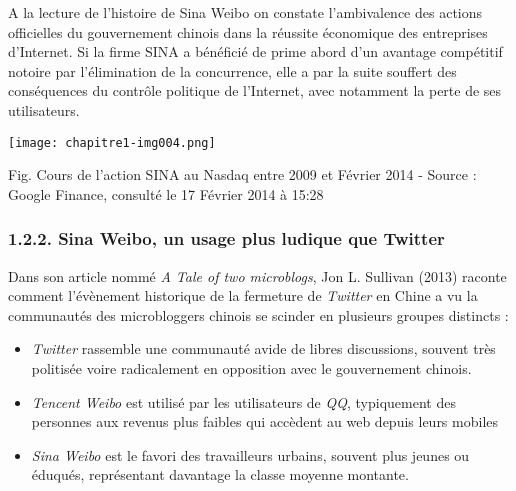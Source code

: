 \bigskip

{\color{black}
A la lecture de l'histoire de Sina Weibo on constate l'ambivalence des actions officielles du gouvernement chinois dans
la r\'eussite \'economique des entreprises d'Internet. Si la firme SINA a b\'en\'efici\'e de prime abord d'un avantage
comp\'etitif notoire par l'\'elimination de la concurrence, elle a par la suite souffert des cons\'equences du
contr\^ole politique de l'Internet, avec notamment la perte de ses utilisateurs.}


\bigskip



\begin{center}
\texttt{[image: chapitre1-img004.png]}
\end{center}
{\raggedleft\color{black}
Fig. Cours de l'action SINA au Nasdaq entre 2009 et F\'evrier 2014 - \newline
Source : Google Finance, consult\'e le 17 F\'evrier 2014 \`a 15:28 
\par}


\bigskip

\subsubsection[1.2.2. Sina Weibo, un usage plus ludique que Twitter ]{1.2.2. Sina Weibo, un usage plus ludique que
Twitter }
\hypertarget{RefHeading131699228146}{}{\color{black}
Dans son article nomm\'e \textit{A Tale of two microblogs}, Jon L. Sullivan (2013) raconte comment l'\'ev\`enement
historique de la fermeture de \textit{Twitter }en Chine a vu la communaut\'es des microbloggers chinois se scinder en
plusieurs groupes distincts : }

\liststyleWWviiiNumii
\begin{itemize}
\item {\color{black}
\textit{Twitter }rassemble une communaut\'e avide de libres discussions, souvent tr\`es politis\'ee voire radicalement
en opposition avec le gouvernement chinois.}
\item {\color{black}
\textit{Tencent Weibo} est utilis\'e par les utilisateurs de \textit{QQ}, typiquement des personnes aux revenus plus
faibles qui acc\`edent au web depuis leurs mobiles}
\item {\color{black}
\textit{Sina Weibo} est le favori des travailleurs urbains, souvent plus jeunes ou \'eduqu\'es, repr\'esentant davantage
la classe moyenne montante.}
\end{itemize}

